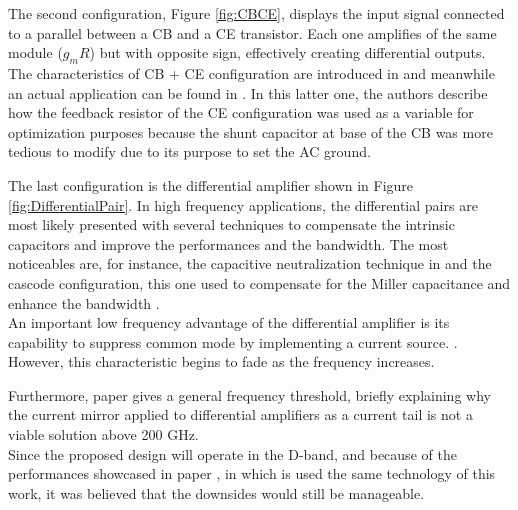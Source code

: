 The second configuration, Figure \ref{fig:CBCE}, displays the input signal connected to a parallel between a CB and a CE transistor. Each one amplifies of the same module ($g_mR$) but with opposite sign, effectively creating differential outputs.
The characteristics of CB + CE configuration are introduced in \cite{Three Compact Active Baluns with High Phase/Amplitude Balance and Low Power in 65-nm CMOS} and \cite{Active Single-Ended to Differential Converter (Balun) for DC up to 70 GHz in 130 nm SiGe} meanwhile an actual application can be found in \cite{Transformer_matched_gilbert_mixer}. In this latter one, the authors describe how the feedback resistor of the CE configuration was used as a variable for optimization purposes because the shunt capacitor at base of the CB was more tedious to modify due to its purpose to set the AC ground.

The last configuration is the differential amplifier shown in Figure \ref{fig:DifferentialPair}. 
In high frequency applications, the differential pairs are most likely presented with several techniques to compensate the intrinsic capacitors and improve the performances and the bandwidth. The most noticeables are, for instance, the capacitive neutralization technique in \cite{Active BALUN with 40 GHz bandwidth at 257 GHz} and the cascode configuration, this one used to compensate for the Miller capacitance and enhance the bandwidth \cite{Active BALUN with 40 GHz bandwidth at 257 GHz} \cite{Active Single-Ended to Differential Converter (Balun) for DC up to 70 GHz in 130 nm SiGe}.\\
An important low frequency advantage of the differential amplifier is its capability to suppress common mode by implementing a current source. \cite{Active Single-Ended to Differential Converter (Balun) for DC up to 70 GHz in 130 nm SiGe}.
However, this characteristic begins to fade as the frequency increases.

Furthermore, paper \cite{Active BALUN with 40 GHz bandwidth at 257 GHz} gives a general frequency threshold, briefly explaining why the current mirror applied to differential amplifiers as a current tail is not a viable solution above 200 GHz.\\
Since the proposed design will operate in the D-band, and because of the performances showcased in paper \cite{Ultra Broadband Low-Power 70 GHz Active Balun in 130-nm SiGe BiCMOS}, in which is used the same technology of this work, it was believed that the downsides would still be manageable.

